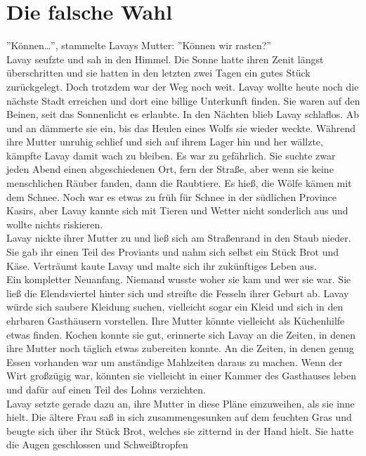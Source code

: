 \chapter{Die falsche Wahl}


''Können…'', stammelte Lavays Mutter: ''Können wir rasten?''\\
Lavay seufzte und sah in den Himmel. Die Sonne hatte ihren Zenit längst überschritten und sie 
hatten in den letzten zwei Tagen ein gutes Stück zurückgelegt. Doch trotzdem war der Weg noch weit. 
Lavay wollte heute noch die nächste Stadt erreichen und dort eine billige Unterkunft finden. Sie 
waren auf den Beinen, seit das Sonnenlicht es erlaubte. In den Nächten blieb Lavay schlaflos. Ab 
und an dämmerte sie ein, bis das Heulen eines Wolfs sie wieder weckte. Während ihre Mutter unruhig 
schlief und sich auf ihrem Lager hin und her wällzte, kämpfte Lavay damit wach zu bleiben. Es war 
zu gefährlich. Sie suchte zwar jeden Abend einen abgeschiedenen Ort, fern der Straße, aber wenn sie 
keine menschlichen Räuber fanden, dann die Raubtiere. Es hieß, die Wölfe kämen mit dem Schnee. Noch 
war es etwas zu früh für Schnee in der südlichen Province Kasirs, aber Lavay kannte sich mit Tieren 
und Wetter nicht sonderlich aus und wollte nichts riskieren.\\
Lavay nickte ihrer Mutter zu und ließ sich am Straßenrand in den Staub nieder. Sie gab ihr einen 
Teil des Proviants und nahm sich selbst ein Stück Brot und Käse. Verträumt kaute Lavay und malte 
sich ihr zukünftiges Leben aus.\\
Ein kompletter Neuanfang. Niemand wusste woher sie kam und wer sie war. Sie ließ die Elendsviertel 
hinter sich und streifte die Fesseln ihrer Geburt ab. Lavay würde sich saubere Kleidung suchen, 
vielleicht sogar ein Kleid und sich in den ehrbaren Gasthäusern vorstellen. Ihre Mutter könnte 
vielleicht als Küchenhilfe etwas finden. Kochen konnte sie gut, erinnerte sich Lavay an die Zeiten, 
in denen ihre Mutter noch täglich etwas zubereiten konnte. An die Zeiten, in denen genug Essen 
vorhanden war um anständige Mahlzeiten daraus zu machen. Wenn der Wirt großzügig war, könnten sie 
vielleicht in einer Kammer des Gasthauses leben und dafür auf einen Teil des Lohns verzichten.\\
Lavay setzte gerade dazu an, ihre Mutter in diese Pläne einzuweihen, als sie inne hielt. Die ältere 
Frau saß in sich zusammengesunken auf dem feuchten Gras und beugte sich über ihr Stück Brot, 
welches sie zitternd in der Hand hielt. Sie hatte die Augen geschlossen und Schweißtropfen 
